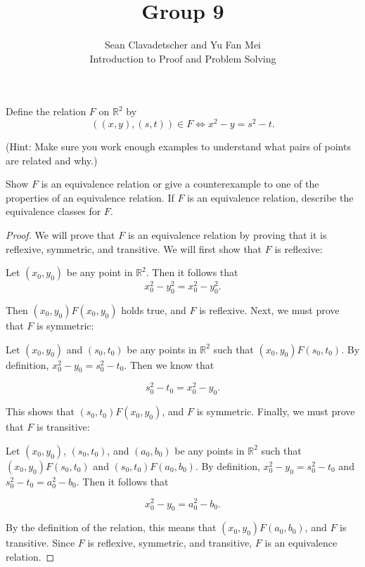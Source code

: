 \documentclass[12pt]{article}
\newenvironment{problem}[2][Problem]{\begin{trivlist}
\item[\hskip \labelsep {\bfseries #1}\hskip \labelsep {\bfseries #2.}]}{\end{trivlist}}
\begin{document}

\title{Group 9}%
\author{Sean Clavadetscher and Yu Fan Mei\\
	Introduction to Proof and Problem Solving} %

\maketitle

\begin{problem}{6}
    Define the relation \(F\) on \(\mathbb{R}^2\) by  
\[
((x, y), (s, t)) \in F \iff x^2 - y = s^2 - t.
\]

(Hint: Make sure you work enough examples to understand what pairs of points are related and why.) 

Show \(F\) is an equivalence relation or give a counterexample to one of the properties of an equivalence relation. If \(F\) is an equivalence relation, describe the equivalence classes for \(F\).
\end{problem}

\begin{proof}
    We will prove that $F$ is an equivalence relation by proving that it is reflexive, symmetric, and transitive. We will first show that $F$ is reflexive:

    Let $(x_0, y_0)$ be any point in $\mathbb{R}^2$. Then it follows that
    $$x_0^2 - y_0^2 = x_0^2 - y_0^2.$$
    
    \noindent
    Then $(x_0, y_0)F(x_0, y_0)$ holds true, and $F$ is reflexive. Next, we must prove that $F$ is symmetric:

    Let $(x_0, y_0)$ and $(s_0, t_0)$ be any points in $\mathbb{R}^2$ such that $(x_0, y_0)F(s_0, t_0)$. By definition, $x_0^2 - y_0 = s_0^2 - t_0$. Then we know that 
    
    $$s_0^2 - t_0 = x_0^2 - y_0.$$

    \noindent
    This shows that $(s_0, t_0)F(x_0, y_0)$, and $F$ is symmetric. Finally, we must prove that $F$ is transitive:

    Let $(x_0, y_0)$, $(s_0, t_0)$, and $(a_0, b_0)$ be any points in $\mathbb{R}^2$ such that $(x_0, y_0)F(s_0, t_0)$ and $(s_0, t_0)F(a_0, b_0)$. By definition, $x_0^2 - y_0 = s_0^2 - t_0$ and $s_0^2 - t_0 = a_0^2 - b_0$. Then it follows that
    
    $$x_0^2 - y_0 = a_0^2 - b_0.$$

    By the definition of the relation, this means that $(x_0, y_0)F(a_0, b_0)$, and $F$ is transitive. Since $F$ is reflexive, symmetric, and transitive, $F$ is an equivalence relation.

\end{proof}
\end{document}
